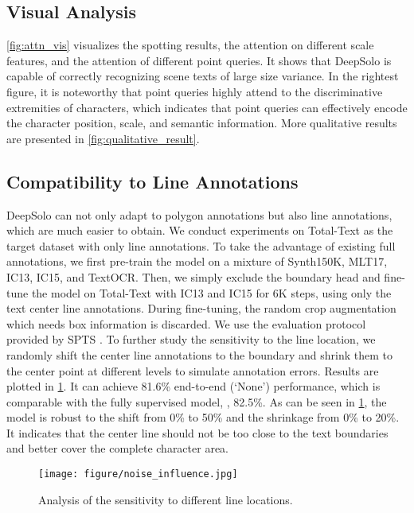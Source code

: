 \documentclass[10pt,twocolumn,letterpaper]{article}
\begin{document}
\begin{table}[!t]
\subsection{Visual Analysis}
\cref{fig:attn_vis} visualizes the spotting results, the attention on different scale features, and the attention of different point queries. It shows that DeepSolo is capable of correctly recognizing scene texts of large size variance. 
In the rightest figure, it is noteworthy that point queries highly attend to the discriminative extremities of characters, which indicates that point queries can effectively encode the character position, scale, and semantic information. More qualitative results are presented in \cref{fig:qualitative_result}.

\subsection{Compatibility to Line Annotations}
DeepSolo can not only adapt to polygon annotations but also line annotations, which are much easier to obtain. We conduct experiments on Total-Text as the target dataset with only line annotations. To take the advantage of existing full annotations, we first pre-train the model on a mixture of Synth150K, MLT17, IC13, IC15, and TextOCR. Then, we simply exclude the boundary head and fine-tune the model on Total-Text with IC13 and IC15 for 6K steps, using only the text center line annotations. During fine-tuning, the random crop augmentation which needs box information is discarded. We use the evaluation protocol provided by SPTS \cite{peng2022spts}. To further study the sensitivity to the line location, we randomly shift the center line annotations to the boundary and shrink them to the center point at different levels to simulate annotation errors. Results are plotted in \cref{fig:noise_analysis}. It can achieve 81.6\% end-to-end (‘None') performance, which is comparable with the fully supervised model, \ie, 82.5\%. As can be seen in \cref{fig:noise_analysis}, the model is robust to the shift from 0\% to 50\% and the shrinkage from 0\% to 20\%. It indicates that the center line should not be too close to the text boundaries and better cover the complete character area. 

\begin{figure}[!t]
    \centering
    \texttt{[image: figure/noise\_influence.jpg]}
    \caption{Analysis of the sensitivity to different line locations.}
    \label{fig:noise_analysis}
\end{figure}



\end{table}
\end{document}
